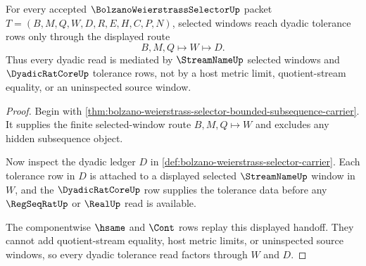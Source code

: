 \begin{theorem}
\label{thm:bolzano-weierstrass-selector-dyadic-window-obligation}
For every accepted $\BolzanoWeierstrassSelectorUp$ packet $T=(B,M,Q,W,D,R,E,H,C,P,N)$, selected windows reach dyadic tolerance rows only through the displayed route
$$
B,M,Q\longmapsto W\longmapsto D.
$$
Thus every dyadic read is mediated by $\StreamNameUp$ selected windows and $\DyadicRatCoreUp$ tolerance rows, not by a host metric limit, quotient-stream equality, or an uninspected source window.
\end{theorem}
\begin{proof}
Begin with \autoref{thm:bolzano-weierstrass-selector-bounded-subsequence-carrier}. It supplies the finite selected-window route $B,M,Q\longmapsto W$ and excludes any hidden subsequence object.

Now inspect the dyadic ledger $D$ in \autoref{def:bolzano-weierstrass-selector-carrier}. Each tolerance row in $D$ is attached to a displayed selected $\StreamNameUp$ window in $W$, and the $\DyadicRatCoreUp$ row supplies the tolerance data before any $\RegSeqRatUp$ or $\RealUp$ read is available.

The componentwise $\hsame$ and $\Cont$ rows replay this displayed handoff. They cannot add quotient-stream equality, host metric limits, or uninspected source windows, so every dyadic tolerance read factors through $W$ and $D$.
\end{proof}

